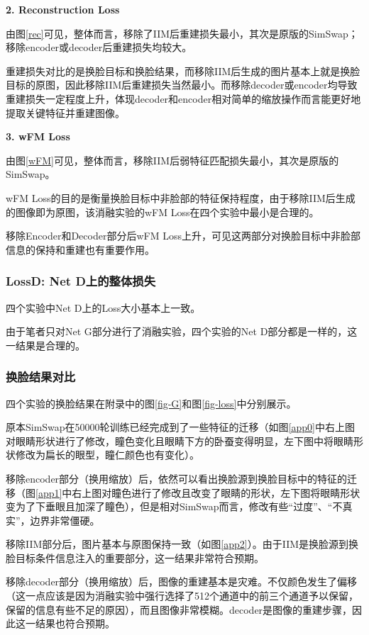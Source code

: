 \documentclass[a4paper]{article}
\begin{document}
\textbf{2. Reconstruction Loss}

由图\ref{rec}可见，整体而言，移除了IIM后重建损失最小，其次是原版的SimSwap；移除encoder或decoder后重建损失均较大。

重建损失对比的是换脸目标和换脸结果，而移除IIM后生成的图片基本上就是换脸目标的原图，因此移除IIM后重建损失当然最小。而移除decoder或encoder均导致重建损失一定程度上升，体现decoder和encoder相对简单的缩放操作而言能更好地提取关键特征并重建图像。

\vspace{1.5em}
\textbf{3. wFM Loss}

由图\ref{wFM}可见，整体而言，移除IIM后弱特征匹配损失最小，其次是原版的SimSwap。

wFM Loss的目的是衡量换脸目标中非脸部的特征保持程度，由于移除IIM后生成的图像即为原图，该消融实验的wFM Loss在四个实验中最小是合理的。

移除Encoder和Decoder部分后wFM Loss上升，可见这两部分对换脸目标中非脸部信息的保持和重建也有重要作用。

\subsubsection{LossD: Net D上的整体损失}

四个实验中Net D上的Loss大小基本上一致。

由于笔者只对Net G部分进行了消融实验，四个实验的Net D部分都是一样的，这一结果是合理的。

\subsubsection{换脸结果对比}

四个实验的换脸结果在附录中的图\ref{fig-G}和图\ref{fig-loss}中分别展示。

原本SimSwap在50000轮训练已经完成到了一些特征的迁移（如图\ref{app0}中右上图对眼睛形状进行了修改，瞳色变化且眼睛下方的卧蚕变得明显，左下图中将眼睛形状修改为扁长的眼型，瞳仁颜色也有变化）。

移除encoder部分（换用缩放）后，依然可以看出换脸源到换脸目标中的特征的迁移（图\ref{app1}中右上图对瞳色进行了修改且改变了眼睛的形状，左下图将眼睛形状变为了下垂眼且加深了瞳色），但是相对SimSwap而言，修改有些“过度”、“不真实”，边界非常僵硬。

移除IIM部分后，图片基本与原图保持一致（如图\ref{app2}）。由于IIM是换脸源到换脸目标条件信息注入的重要部分，这一结果非常符合预期。

移除decoder部分（换用缩放）后，图像的重建基本是灾难。不仅颜色发生了偏移（这一点应该是因为消融实验中强行选择了512个通道中的前三个通道予以保留，保留的信息有些不足的原因），而且图像非常模糊。decoder是图像的重建步骤，因此这一结果也符合预期。
\end{document}
